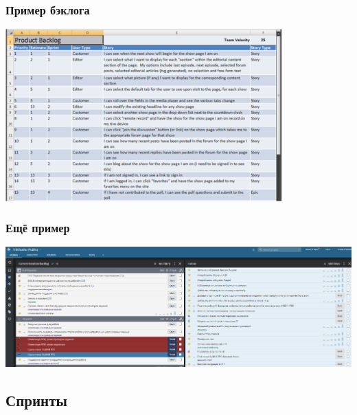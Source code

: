 \documentclass[xetex,mathserif,serif]{beamer}
\begin{document}
    \begin{frame}
        \frametitle{Пример бэклога}
        \begin{center}
            \includegraphics[width=0.8\textwidth]{backlog-1.png}
        \end{center}
    \end{frame}

    \begin{frame}
        \frametitle{Ещё пример}
        \begin{center}
            \includegraphics[width=1\textwidth]{backlog-2.png}
        \end{center}
    \end{frame}

    \subsection{Спринты}
\end{document}
